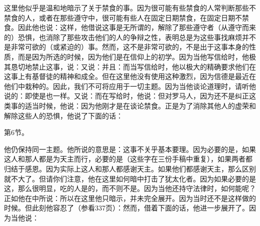 这里他似乎是温和地暗示了关于禁食的事。因为很可能有些禁食的人常判断那些不禁食的人，或者在那些遵守中，很可能有些人在固定日期禁食，在固定日期不禁食。因此他也说：这样，他借说这事是无所谓的，解除了那些遵守者（从遵守而来的）恐惧，也消除了那些攻击他们的人的争辩之性，表明总是为这些事找麻烦并不是非常可欲的（或紧迫的）事。然而，这不是非常可欲的，不是出于这事本身的性质，而是因为所选的时候，因为他们是在信仰上的初学。因为当他写信给时，他极其恳切地禁止这事，说：又说：并且：而当写信给时，他以极大的精确要求他们在这事上有基督徒的精神和成全。但在这里他没有使用这种激烈，因为信德是最近在他们中栽种的。因此，我们不可将应用于一切主题。因为当他谈论道理时，请听他说的：即使是也一样。又说：而在写给时，他说：但对罗马人，因为还不是纠正这类事的适当时候，他说：因为他刚才是在谈论禁食。正是为了消除其他人的虚荣和解除这些人的恐惧，他说了下面的话：\par

第6节。\par

他仍保持同一主题。他所说的意思是：这事不关乎基本要理。因为必要的是，如果这人和那人都是为天主而行，必要的是（这些字在三份手稿中重复），如果两者都归结于感恩。因为实际上这人和那人都感谢天主。如果他们都感谢天主，那么区别就不大了。但请你们注意，他在这里如何暗中打击了犹太化者。因为如果必要的是这，那么很明显，吃的人是的，而不则不是。因为当他还持守法律时，如何能呢？正如他在中所说：所以在这里他只暗示，并未完全展开。因为当时还不是这样做的时候。但此刻他容忍了（参看337页）：然而，借着下面的话，他进一步展开了。因为当他说：\par

